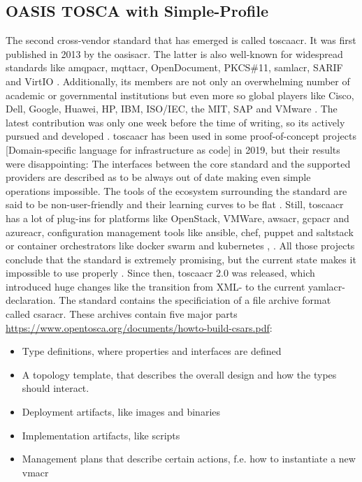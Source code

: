 \subsection{OASIS TOSCA with Simple-Profile}
The second cross-vendor standard that has emerged is called \gls{toscaacr}. It was first published in 2013 by the \gls{oasisacr}. The latter is also well-known for widespread standards like \gls{amqpacr}, \gls{mqttacr}, OpenDocument, PKCS\#11, \gls{samlacr}, SARIF and VirtIO \cite{oasis_standards}. Additionally, its members are not only an overwhelming number of academic or governmental institutions but even more so global players like Cisco, Dell, Google, Huawei, HP, IBM, ISO/IEC, the MIT, SAP and VMware \cite{oasis_tosca_members} \cite{oasis_tosca_obligations} \cite{oasis_members}. The latest contribution was only one week before the time of writing, so its actively pursued and developed \cite{tosca_standard_v2} \cite{tosca_releases}.
\newline
\gls{toscaacr} has been used in some proof-of-concept projects [Domain-specific language for infrastructure as code] in 2019, but their results were disappointing: The interfaces between the core standard and the supported providers are described as to be always out of date making even simple operations impossible. The tools of the ecosystem surrounding the standard are said to be non-user-friendly and their learning curves to be flat \cite{adminmagazin_aria_tosca}.
Still, \gls{toscaacr} has a lot of plug-ins for platforms like OpenStack, VMWare, \gls{awsacr}, \gls{gcpacr} and \gls{azureacr}, configuration management tools like ansible, chef, puppet and saltstack or container orchestrators like docker swarm and kubernetes \cite{adminmagazin_aria_tosca}, \cite{vmware_tosca_components}.
All those projects conclude that the standard is extremely promising, but the current state makes it impossible to use properly \cite{adminmagazin_aria_tosca}.
\newline
Since then, \gls{toscaacr} 2.0 was released, which introduced huge changes like the transition from XML- to the current \gls{yamlacr}-declaration.
\newline
The standard contains the specificiation of a file archive format called \gls{csaracr}. These archives contain five major parts \url{https://www.opentosca.org/documents/howto-build-csars.pdf}:
\begin{itemize}
  \item Type definitions, where properties and interfaces are defined
  \item A topology template, that describes the overall design and how the types should interact.
  \item Deployment artifacts, like images and binaries
  \item Implementation artifacts, like scripts
  \item Management plans that describe certain actions, f.e. how to instantiate a new \gls{vmacr}
\end{itemize}
